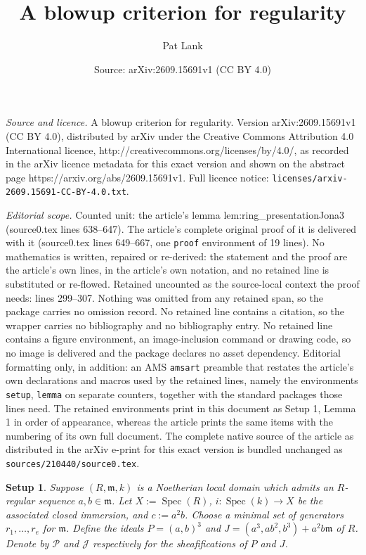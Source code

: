 \documentclass[10pt,a4paper]{amsart}
\title{A blowup criterion for regularity}
\author{Pat Lank}
\date{Source: arXiv:2609.15691v1 (CC BY 4.0)}
\newtheorem{setup}{Setup}
\begin{document}
\maketitle

\noindent\emph{Source and licence.} A blowup criterion for regularity. Version arXiv:2609.15691v1 (CC BY 4.0), distributed by arXiv under the Creative Commons Attribution 4.0 International licence, http://creativecommons.org/licenses/by/4.0/, as recorded in the arXiv licence metadata for this exact version and shown on the abstract page https://arxiv.org/abs/2609.15691v1. Full licence notice: \texttt{licenses/arxiv-2609.15691-CC-BY-4.0.txt}.\par\smallskip

\noindent\textit{Editorial scope.} Counted unit: the article's lemma lem:ring\_presentationJona3 (source0.tex lines 638--647). The article's complete original proof of it is delivered with it (source0.tex lines 649--667, one \texttt{proof} environment of 19 lines). No mathematics is written, repaired or re-derived: the statement and the proof are the article's own lines, in the article's own notation, and no retained line is substituted or re-flowed.  Retained uncounted as the source-local context the proof needs: lines 299--307.  Nothing was omitted from any retained span, so the package carries no omission record.  No retained line contains a citation, so the wrapper carries no bibliography and no bibliography entry.  No retained line contains a figure environment, an image-inclusion command or drawing code, so no image is delivered and the package declares no asset dependency.  Editorial formatting only, in addition: an AMS \texttt{amsart} preamble that restates the article's own declarations and macros used by the retained lines, namely the environments \texttt{setup}, \texttt{lemma} on separate counters, together with the standard packages those lines need.  The retained environments print in this document as Setup 1, Lemma 1 in order of appearance, whereas the article prints the same items with the numbering of its own full document.  The complete native source of the article as distributed in the arXiv e-print for this exact version is bundled unchanged as \texttt{sources/210440/source0.tex}.
\begin{setup}
    \label{setup:main}
    Suppose $(R,\mathfrak{m},k)$ is a Noetherian local domain which admits an $R$-regular sequence $a,b\in \mathfrak{m}$. 
    Let $X:=\operatorname{Spec}(R)$, $i \colon \operatorname{Spec}(k) \to X$ be the associated closed immersion, and $c:=a^2 b$.
    Choose a minimal set of generators $r_1,\ldots,r_e$ for $\mathfrak{m}$.
    Define the ideals $P=(a,b)^3$ and $J=(a^3,ab^2,b^3)+ a^2 b \mathfrak{m}$ of $R$.
    Denote by $\mathcal{P}$ and $\mathcal{J}$ respectively for the sheafifications of $P$ and $J$.
\end{setup}
\end{document}
